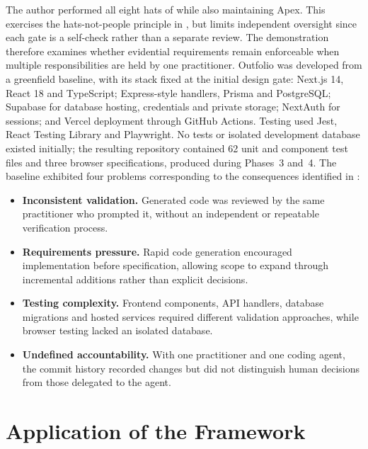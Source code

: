 The author performed all eight hats of  while also maintaining Apex. This exercises the hats-not-people principle in , but limits independent oversight since each gate is a self-check rather than a separate review. The demonstration therefore examines whether evidential requirements remain enforceable when multiple responsibilities are held by one practitioner. Outfolio was developed from a greenfield baseline, with its stack fixed at the initial design gate: Next.js 14, React 18 and TypeScript; Express-style handlers, Prisma and PostgreSQL; Supabase for database hosting, credentials and private storage; NextAuth for sessions; and Vercel deployment through GitHub Actions. Testing used Jest, React Testing Library and Playwright. No tests or isolated development database existed initially; the resulting repository contained 62 unit and component test files and three browser specifications, produced during Phases~3 and~4. The baseline exhibited four problems corresponding to the consequences identified in :

\begin{itemize}[leftmargin=0.6cm, itemsep=0.2em]
    \item \textbf{Inconsistent validation.} Generated code was reviewed by the same practitioner who prompted it, without an independent or repeatable verification process.
    
    \item \textbf{Requirements pressure.} Rapid code generation encouraged implementation before specification, allowing scope to expand through incremental additions rather than explicit decisions.
    
    \item \textbf{Testing complexity.} Frontend components, API handlers, database migrations and hosted services required different validation approaches, while browser testing lacked an isolated database.
    
    \item \textbf{Undefined accountability.} With one practitioner and one coding agent, the commit history recorded changes but did not distinguish human decisions from those delegated to the agent.

\end{itemize}

\section{Application of the Framework}
\label{sec:demo_application}

